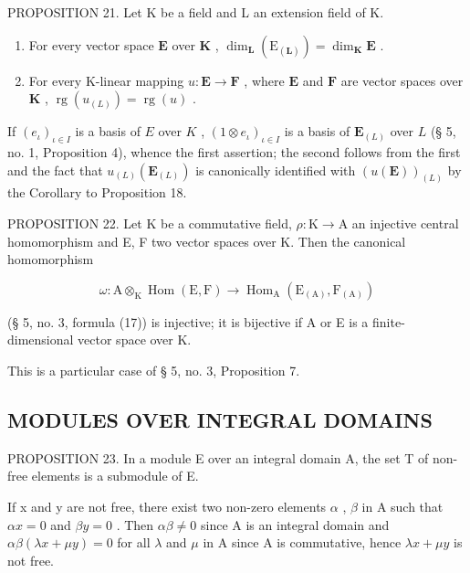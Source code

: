 PROPOSITION 21. Let K be a field and L an extension field of K.

\begin{enumerate}
\def\labelenumi{(\roman{enumi})}
\item
  For every vector space \(\mathbf{E}\) over \(\mathbf{K}\) , \(\dim_{\mathbf{L}}(\mathrm{E}_{(\mathbf{L})}) = \dim_{\mathbf{K}}\mathbf{E}\) .
\item
  For every K-linear mapping \(u: \mathbf{E} \to \mathbf{F}\) , where \(\mathbf{E}\) and \(\mathbf{F}\) are vector spaces over \(\mathbf{K}\) , \(\operatorname{rg}(u_{(L)}) = \operatorname{rg}(u)\) .
\end{enumerate}

If \((e_{\iota})_{\iota\in I}\) is a basis of \(E\) over \(K\) , \((1\otimes e_{\iota})_{\iota\in I}\) is a basis of \(\mathbf{E}_{(L)}\) over \(L\) (§ 5, no. 1, Proposition 4), whence the first assertion; the second follows from the first and the fact that \(u_{(L)}(\mathbf{E}_{(L)})\) is canonically identified with \((u(\mathbf{E}))_{(L)}\) by the Corollary to Proposition 18.

PROPOSITION 22. Let K be a commutative field, \(\rho: \mathrm{K} \to \mathrm{A}\) an injective central homomorphism and E, F two vector spaces over K. Then the canonical homomorphism

\[
\omega : \mathrm{A} \otimes_ {\mathrm{K}} \operatorname{Hom} (\mathrm{E}, \mathrm{F}) \rightarrow \operatorname{Hom} _ {\mathrm{A}} \left(\mathrm{E} _ {(\mathrm{A})}, \mathrm{F} _ {(\mathrm{A})}\right)\tag{36}
\]

(§ 5, no. 3, formula (17)) is injective; it is bijective if A or E is a finite-dimensional vector space over K.

This is a particular case of § 5, no. 3, Proposition 7.

\subsection{MODULES OVER INTEGRAL DOMAINS}

PROPOSITION 23. In a module E over an integral domain A, the set T of non-free elements is a submodule of E.

If x and y are not free, there exist two non-zero elements \(\alpha\) , \(\beta\) in A such that \(\alpha x = 0\) and \(\beta y = 0\) . Then \(\alpha\beta \neq 0\) since A is an integral domain and \(\alpha\beta(\lambda x + \mu y) = 0\) for all \(\lambda\) and \(\mu\) in A since A is commutative, hence \(\lambda x + \mu y\) is not free.

